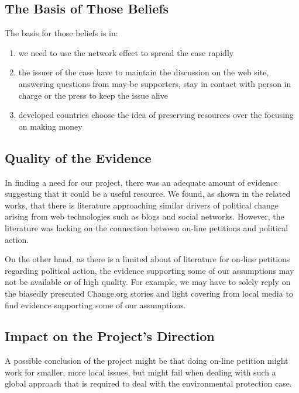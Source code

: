 \subsection{The Basis of Those Beliefs}
\label{subsec:basisofbeliefs}

The basis for those beliefs is in:

\begin{enumerate}

	\item we need to use the network effect to spread the case rapidly
    \item the issuer of the case have to maintain the discussion on the web site, answering questions from may-be supporters, stay in contact with person in charge or the press to keep the issue alive 
    \item developed countries choose the idea of preserving resources over the focusing on making money

\end{enumerate}
\subsection{Quality of the Evidence}
\label{subsec:qualityofevidence}

In finding a need for our project, there was an adequate amount of evidence suggesting that it could be a useful resource. We found, as shown in the related works, that there is literature approaching similar drivers of political change arising from web technologies such as blogs and social networks. However, the literature was lacking on the connection between on-line petitions and political action. \par
\vspace{0.2cm}
On the other hand, as there is a limited about of literature for on-line petitions regarding political action, the evidence supporting some of our assumptions may not be available or of high quality. For example, we may have to solely reply on the biasedly presented Change.org stories and light covering from local media to find evidence supporting some of our assumptions.

\subsection{Impact on the Project's Direction}
\label{subsec:systemsdirection}

A possible conclusion of the project might be that doing on-line petition might work for smaller, more local issues, but might fail when dealing with such a global approach that is required to deal with the environmental protection case.

